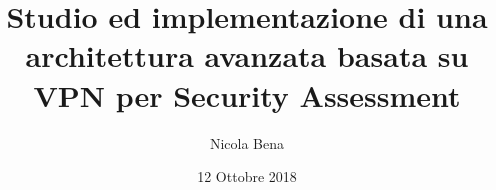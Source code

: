 \documentclass{beamer}
\title[]{Studio ed implementazione di una architettura avanzata basata su VPN per Security Assessment}
\author{Nicola Bena}
\date{12 Ottobre 2018}
\begin{document}
\frame{\titlepage}


\end{document}
